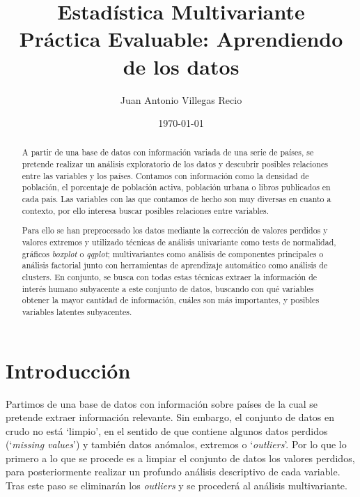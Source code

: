 \documentclass[letterpaper,11pt]{article}
\begin{document}
	\newpage
	


\title{Estadística Multivariante \\\textbf{Práctica Evaluable: Aprendiendo de los datos}}
\author{Juan Antonio Villegas Recio}
\date{\today}
\maketitle

\begin{abstract}

A partir de una base de datos con información variada de una serie de países, se pretende realizar un análisis exploratorio de los datos y descubrir posibles relaciones entre las variables y los países. Contamos con información como la densidad de población, el porcentaje de población activa, población urbana o libros publicados en cada país. Las variables con las que contamos de hecho son muy diversas en cuanto a contexto, por ello interesa buscar posibles relaciones entre variables. 

Para ello se han preprocesado los datos mediante la corrección de valores perdidos y valores extremos y utilizado técnicas de análisis univariante como tests de normalidad, gráficos \textit{boxplot} o \textit{qqplot}; multivariantes como análisis de componentes principales o análisis factorial junto con herramientas de aprendizaje automático como análisis de clusters. En conjunto, se busca con todas estas técnicas extraer la información de interés humano subyacente a este conjunto de datos, buscando con qué variables obtener la mayor cantidad de información, cuáles son más importantes, y posibles variables latentes subyacentes.
 
\end{abstract}

\section{Introducción}

Partimos de una base de datos con información sobre países de la cual se pretende extraer información relevante. Sin embargo, el conjunto de datos en crudo no está `limpio', en el sentido de que contiene algunos datos perdidos (`\textit{missing values}') y también datos anómalos, extremos o `\textit{outliers}'. Por lo que lo primero a lo que se procede es a limpiar el conjunto de datos los valores perdidos, para posteriormente realizar un profundo análisis descriptivo de cada variable. Tras este paso se eliminarán los \textit{outliers} y se procederá al análisis multivariante.
\end{document}
